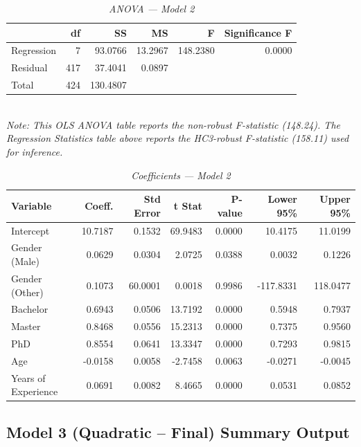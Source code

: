 \documentclass[12pt, a4paper]{article}
\begin{document}
\begin{table}[H]
\centering\scriptsize
\caption*{\textit{ANOVA — Model 2}}
\begin{tabular}{lrrrrr}
\toprule
 & \textbf{df} & \textbf{SS} & \textbf{MS} & \textbf{F} & \textbf{Significance F} \\
\midrule
Regression & 7 & 93.0766 & 13.2967 & 148.2380 & 0.0000 \\
Residual   & 417 & 37.4041 & 0.0897 & & \\
Total      & 424 & 130.4807 & & & \\
\bottomrule
\end{tabular}\\
\textit{Note: This OLS ANOVA table reports the non-robust F-statistic (148.24). The Regression Statistics table above reports the HC3-robust F-statistic (158.11) used for inference.}
\end{table}

\begin{table}[H]
\centering\scriptsize
\caption*{\textit{Coefficients — Model 2}}
\begin{tabular}{lrrrrrr}
\toprule
\textbf{Variable} & \textbf{Coeff.} & \textbf{Std Error} & \textbf{t Stat} & \textbf{P-value} & \textbf{Lower 95\%} & \textbf{Upper 95\%} \\
\midrule
Intercept           & 10.7187 & 0.1532 & 69.9483 & 0.0000 & 10.4175 & 11.0199 \\
Gender (Male)       &  0.0629 & 0.0304 &  2.0725 & 0.0388 &  0.0032 &  0.1226 \\
Gender (Other)      &  0.1073 & 60.0001 &  0.0018 & 0.9986 & -117.8331 & 118.0477 \\
Bachelor            &  0.6943 & 0.0506 & 13.7192 & 0.0000 &  0.5948 &  0.7937 \\
Master              &  0.8468 & 0.0556 & 15.2313 & 0.0000 &  0.7375 &  0.9560 \\
PhD                 &  0.8554 & 0.0641 & 13.3347 & 0.0000 &  0.7293 &  0.9815 \\
Age                 & -0.0158 & 0.0058 & -2.7458 & 0.0063 & -0.0271 & -0.0045 \\
Years of Experience &  0.0691 & 0.0082 &  8.4665 & 0.0000 &  0.0531 &  0.0852 \\
\bottomrule
\end{tabular}
\end{table}

\subsection{Model 3 (Quadratic -- Final) Summary Output}
\end{document}
